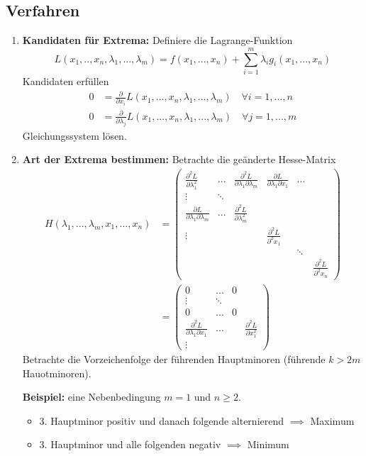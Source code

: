 \documentclass[a4paper, landscape,twocolumn,fontsize=9pt]{scrartcl}
\begin{document}
\subsection*{Verfahren}
\begin{enumerate}
	\item \textbf{Kandidaten für Extrema:} Definiere die Lagrange-Funktion 
	\[
		L(x_1,..,x_n, \lambda_1,...,\lambda_m) = f(x_1,...,x_n) + \sum^m_{i=1} \lambda_i g_i(x_1,...,x_n)
	\]
	Kandidaten erfüllen
	\begin{align*}
		0 &= \frac{\partial}{\partial x_i} L(x_1,...,x_n,\lambda_1,...,\lambda_m) \quad \forall i = 1,...,n \\
		0 &= \frac{\partial}{\partial \lambda_j} L(x_1,...,x_n,\lambda_1,...,\lambda_m) \quad \forall j = 1,...,m
	\end{align*}
	Gleichungssystem lösen.
	
	
	\item \textbf{Art der Extrema bestimmen:} Betrachte die geänderte Hesse-Matrix
	\begin{align*}
		H(\lambda_1,...,\lambda_m, x_1,...,x_n) &= \begin{pmatrix}
			\frac{\partial^2 L}{\partial \lambda_1^2} & ... & \frac{\partial^2 L}{\partial \lambda_1 \partial \lambda_m} & \frac{\partial L}{\partial \lambda_1 \partial x_1} & ... \\
			\vdots & \ddots & \\
			\frac{\partial L}{\partial \lambda_1 \partial \lambda_m} & ... & \frac{\partial^2 L}{\partial \lambda_m^2} \\
			\vdots & & & \frac{\partial^2L}{\partial^2 x_1} \\
			& & & & \ddots \\
			& & & & & \frac{\partial^2 L}{\partial^2 x_n}
		\end{pmatrix} \\
		&= \begin{pmatrix}
			0 & ... & 0 \\
			\vdots & \ddots & \\
			0 & ... & 0 \\
			\frac{\partial^2 L}{\partial \lambda_1 \partial x_1} &... && \frac{\partial^2L}{\partial x_1^2} \\
			\vdots 
		\end{pmatrix}
	\end{align*}
	Betrachte die Vorzeichenfolge der führenden Hauptminoren (führende $k > 2m$ Hauotminoren).
	
	\textbf{Beispiel:} eine Nebenbedingung $m = 1$ und $n \geq 2$.
	\begin{itemize}
		\item 3. Hauptminor positiv und danach folgende alternierend $\implies$ Maximum
		\item 3. Hauptminor und alle folgenden negativ $\implies$ Minimum
	\end{itemize}
\end{enumerate}
\end{document}

